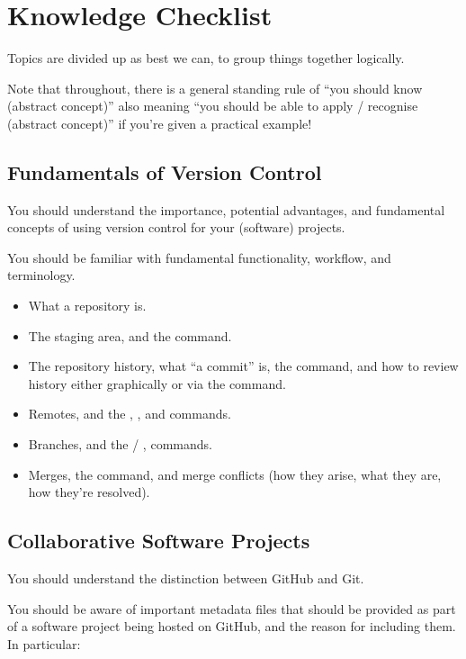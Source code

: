 \section{Knowledge Checklist}

Topics are divided up as best we can, to group things together logically.

Note that throughout, there is a general standing rule of ``you should know (abstract concept)'' also meaning ``you should be able to apply / recognise (abstract concept)'' if you're given a practical example!

\subsection{Fundamentals of Version Control}

You should understand the importance, potential advantages, and fundamental concepts of using version control for your (software) projects.

You should be familiar with fundamental  functionality, workflow, and terminology.

\begin{itemize}
  \item What a repository is.
  \item The staging area, and the  command.
  \item The repository history, what ``a commit'' is, the  command, and how to review history either graphically or via the  command.
  \item Remotes, and the , , and  commands.
  \item Branches, and the  / ,  commands.
  \item Merges, the  command, and merge conflicts (how they arise, what they are, how they're resolved).
\end{itemize}

\subsection{Collaborative Software Projects}

You should understand the distinction between GitHub and Git.

You should be aware of important metadata files that should be provided as part of a software project being hosted on GitHub, and the reason for including them.
In particular:

